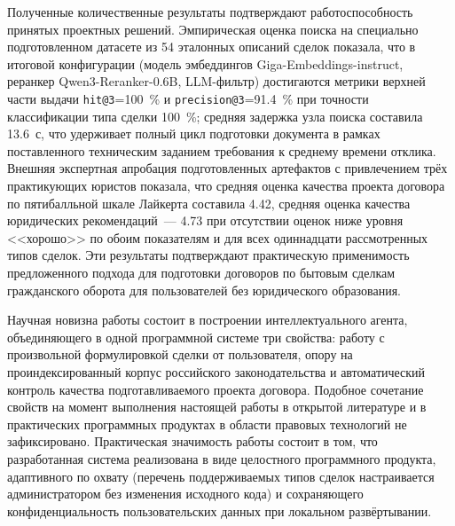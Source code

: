 Полученные количественные результаты подтверждают работоспособность принятых проектных решений. Эмпирическая оценка поиска на специально подготовленном датасете из 54 эталонных описаний сделок показала, что в итоговой конфигурации (модель эмбеддингов Giga-Embeddings-instruct, реранкер Qwen3-Reranker-0.6B, LLM-фильтр) достигаются метрики верхней части выдачи \texttt{hit@3}=100~\% и \texttt{precision@3}=91.4~\% при точности классификации типа сделки 100~\%; средняя задержка узла поиска составила 13.6~с, что удерживает полный цикл подготовки документа в рамках поставленного техническим заданием требования к среднему времени отклика. Внешняя экспертная апробация подготовленных артефактов с привлечением трёх практикующих юристов показала, что средняя оценка качества проекта договора по пятибалльной шкале Лайкерта составила 4.42, средняя оценка качества юридических рекомендаций~--- 4.73 при отсутствии оценок ниже уровня <<хорошо>> по обоим показателям и для всех одиннадцати рассмотренных типов сделок. Эти результаты подтверждают практическую применимость предложенного подхода для подготовки договоров по бытовым сделкам гражданского оборота для пользователей без юридического образования.

Научная новизна работы состоит в построении интеллектуального агента, объединяющего в одной программной системе три свойства: работу с произвольной формулировкой сделки от пользователя, опору на проиндексированный корпус российского законодательства и автоматический контроль качества подготавливаемого проекта договора. Подобное сочетание свойств на момент выполнения настоящей работы в открытой литературе и в практических программных продуктах в области правовых технологий не зафиксировано. Практическая значимость работы состоит в том, что разработанная система реализована в виде целостного программного продукта, адаптивного по охвату (перечень поддерживаемых типов сделок настраивается администратором без изменения исходного кода) и сохраняющего конфиденциальность пользовательских данных при локальном развёртывании.

